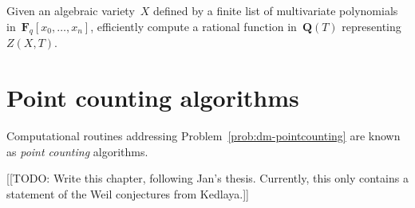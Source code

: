 \begin{prob} \label{prob:dm-pointcounting}
Given an algebraic variety~$X$ defined by a finite list of 
multivariate polynomials in~$\mathbf{F}_{q}[x_0, \dotsc, x_n]$, 
efficiently compute a rational function in~$\mathbf{Q}(T)$ 
representing $Z(X, T)$.
\end{prob}


\section{Point counting algorithms}

Computational routines addressing Problem~\ref{prob:dm-pointcounting} 
are known as \emph{point counting} algorithms.

[[TODO:  Write this chapter, following Jan's thesis.  Currently, 
this only contains a statement of the Weil conjectures from 
Kedlaya.]]
